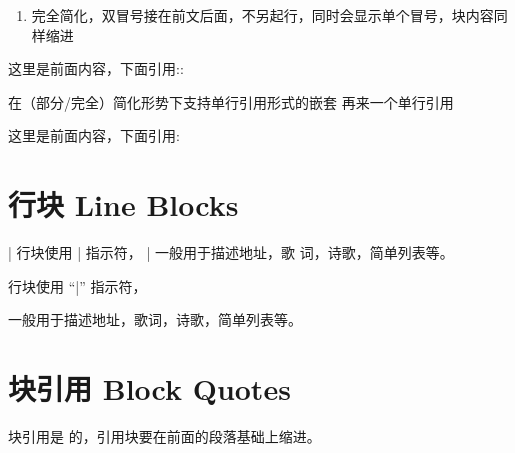 \documentclass[a4paper,10pt,english]{sphinxmanual}
\begin{document}
\begin{sphinxVerbatim}[commandchars=\\\{\}]
\end{sphinxVerbatim}
\begin{enumerate}
%
\setcounter{enumi}{2}
\item {} 
\sphinxAtStartPar
完全简化，双冒号接在前文后面，不另起行，同时会显示单个冒号，块内容同样缩进

\end{enumerate}

\sphinxAtStartPar
{}

\begin{sphinxVerbatim}[commandchars=\\\{\}]
这里是前面内容，下面引用::

\PYGZgt{} 在（部分/完全）简化形势下支持单行引用形式的嵌套
\PYGZgt{} 再来一个单行引用
\end{sphinxVerbatim}

\sphinxAtStartPar
{}

\sphinxAtStartPar
这里是前面内容，下面引用:

\begin{sphinxVerbatim}[commandchars=\\\{\}]
 
 
\end{sphinxVerbatim}


\section{行块 Line Blocks}
\label{\detokenize{reStructureText_syntax:line-blocks}}
\begin{sphinxVerbatim}[commandchars=\\\{\}]
| 行块使用 | 指示符，
| 一般用于描述地址，歌
  词，诗歌，简单列表等。
\end{sphinxVerbatim}

\sphinxAtStartPar
{}

\begin{DUlineblock}{0em}
\item[] 行块使用 “|” 指示符，
\item[] 一般用于描述地址，歌词，诗歌，简单列表等。
\end{DUlineblock}


\section{块引用 Block Quotes}
\label{\detokenize{reStructureText_syntax:block-quotes}}
\sphinxAtStartPar
块引用是  的，引用块要在前面的段落基础上缩进。
\end{document}
